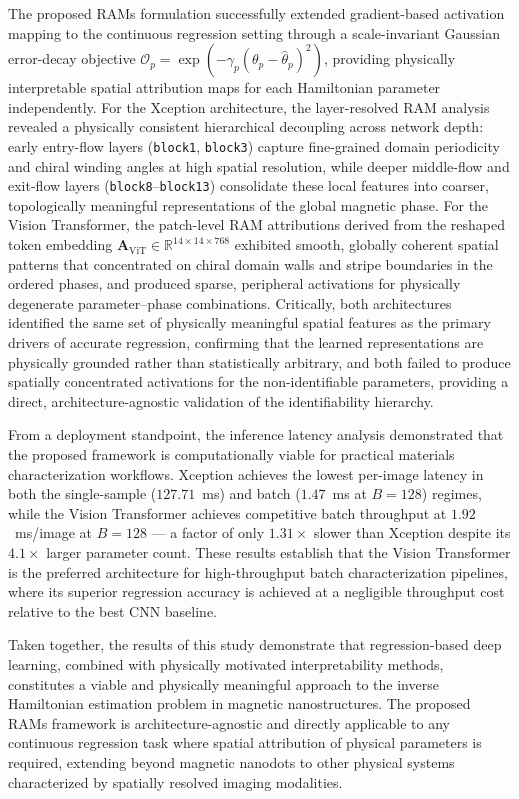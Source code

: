 \documentclass[a4paper,fleqn]{cas-sc}
\begin{document}
The proposed RAMs formulation successfully
extended gradient-based activation mapping to the continuous
regression setting through a scale-invariant Gaussian error-decay
objective $\mathcal{O}_p = \exp(-\gamma_p(\theta_p -
\hat{\theta}_p)^2)$, providing physically interpretable spatial
attribution maps for each Hamiltonian parameter independently. For the
Xception architecture, the layer-resolved RAM analysis revealed a
physically consistent hierarchical decoupling across network depth:
early entry-flow layers (\texttt{block1}, \texttt{block3}) capture
fine-grained domain periodicity and chiral winding angles at high
spatial resolution, while deeper middle-flow and exit-flow layers
(\texttt{block8}--\texttt{block13}) consolidate these local features
into coarser, topologically meaningful representations of the global
magnetic phase. For the Vision Transformer, the patch-level RAM
attributions derived from the reshaped token embedding
$\mathbf{A}_{\text{ViT}} \in \mathbb{R}^{14 \times 14 \times 768}$
exhibited smooth, globally coherent spatial patterns that concentrated
on chiral domain walls and stripe boundaries in the ordered phases,
and produced sparse, peripheral activations for physically degenerate
parameter--phase combinations. Critically, both architectures
identified the same set of physically meaningful spatial features as
the primary drivers of accurate regression, confirming that the
learned representations are physically grounded rather than
statistically arbitrary, and both failed to produce spatially
concentrated activations for the non-identifiable parameters,
providing a direct, architecture-agnostic validation of the
identifiability hierarchy.
 
From a deployment standpoint, the inference latency analysis
demonstrated that the proposed framework is computationally viable for
practical materials characterization workflows. Xception achieves the
lowest per-image latency in both the single-sample ($127.71$~ms) and
batch ($1.47$~ms at $B = 128$) regimes, while the Vision Transformer
achieves competitive batch throughput at $1.92$~ms/image at $B = 128$
--- a factor of only $1.31\times$ slower than Xception despite its
$4.1\times$ larger parameter count. These results establish that the
Vision Transformer is the preferred architecture for high-throughput
batch characterization pipelines, where its superior regression
accuracy is achieved at a negligible throughput cost relative to the
best CNN baseline.
 
Taken together, the results of this study demonstrate that
regression-based deep learning, combined with physically motivated
interpretability methods, constitutes a viable and physically
meaningful approach to the inverse Hamiltonian estimation problem in
magnetic nanostructures. The proposed RAMs framework is
architecture-agnostic and directly applicable to any continuous
regression task where spatial attribution of physical parameters is
required, extending beyond magnetic nanodots to other physical systems
characterized by spatially resolved imaging modalities.
 
\end{document}
